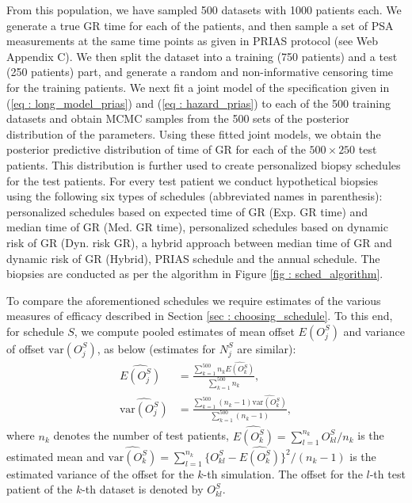 From this population, we have sampled 500 datasets with 1000 patients each. We generate a true GR time for each of the patients, and then sample a set of PSA measurements at the same time points as given in PRIAS protocol (see Web Appendix C). We then split the dataset into a training (750 patients) and a test (250 patients) part, and generate a random and non-informative censoring time for the training patients. We next fit a joint model of the specification given in (\ref{eq : long_model_prias}) and (\ref{eq : hazard_prias}) to each of the 500 training datasets and obtain MCMC samples from the 500 sets of the posterior distribution of the parameters. Using these fitted joint models, we obtain the posterior predictive distribution of time of GR for each of the $500 \times 250$ test patients. This distribution is further used to create personalized biopsy schedules for the test patients. For every test patient we conduct hypothetical biopsies using the following six types of schedules (abbreviated names in parenthesis): personalized schedules based on expected time of GR (Exp. GR time) and median time of GR (Med. GR time), personalized schedules based on dynamic risk of GR (Dyn. risk GR), a hybrid approach between median time of GR and dynamic risk of GR (Hybrid), PRIAS schedule and the annual schedule. The biopsies are conducted as per the algorithm in Figure \ref{fig : sched_algorithm}. 

To compare the aforementioned schedules we require estimates of the various measures of efficacy described in Section \ref{sec : choosing_schedule}. To this end, for schedule $S$, we compute pooled estimates of mean offset $E(O^S_j)$ and variance of offset $\mbox{var}(O^S_j)$, as below (estimates for $N^S_j$ are similar):
\begin{align*}
\widehat{E(O^S_j)} &= \frac{\sum_{k=1}^{500} n_k \widehat{E(O^S_k)}}{\sum_{k=1}^{500} n_k}, \\
\widehat{\mbox{var}(O^S_j)} &= \frac{\sum_{k=1}^{500} (n_k - 1) \widehat{\mbox{var}(O^S_k)}}{\sum_{k=1}^{500} (n_k-1)}, 
\end{align*}
where $n_k$ denotes the number of test patients, $\widehat{E(O^S_k)} = {\sum_{l=1}^{n_k}O^S_{kl}}/{n_k}$ is the estimated mean and $\widehat{\mbox{var}(O^S_k)} = {\sum_{l=1}^{n_k}\big\{O^S_{kl} - \widehat{E(O^S_k)}\big\}^2}/(n_k-1)$ is the estimated variance of the offset for the $k$-th simulation. The offset for the $l$-th test patient of the $k$-th dataset is denoted by $O^S_{kl}$.


